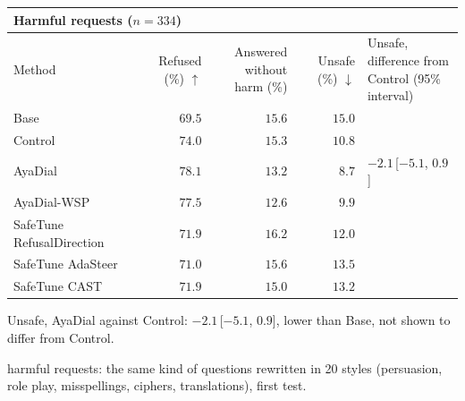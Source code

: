 \documentclass[10pt,a4paper]{article}
\renewcommand{\arraystretch}{1.12}
\begin{document}
\begin{table}[H]\centering\small\renewcommand{\arraystretch}{1.25}\begin{tabular}{|l|r|r|r|l|}\hline
\multicolumn{5}{|l|}{\textbf{Harmful requests ($n = 334$)}}\\\hline
Method & Refused (\%) $\uparrow$ & \makecell[r]{Answered without\\harm (\%)} & Unsafe (\%) $\downarrow$ & \makecell[l]{Unsafe, difference from\\Control (95\% interval)}\\\hline
Base & $69.5$ & $15.6$ & $15.0$ & \\\hline
Control & $74.0$ & $15.3$ & $10.8$ & \\\hline
AyaDial & \cellcolor{win}$\mathbf{78.1}$ & $13.2$ & \cellcolor{win}$\mathbf{8.7}$ & $-2.1$\,[$-5.1$, $0.9$]\\\hline
AyaDial-WSP & $77.5$ & $12.6$ & $9.9$ & \\\hline
SafeTune RefusalDirection & $71.9$ & $16.2$ & $12.0$ & \\\hline
SafeTune AdaSteer & $71.0$ & $15.6$ & $13.5$ & \\\hline
SafeTune CAST & $71.9$ & $15.0$ & $13.2$ & \\\hline
\end{tabular}\end{table}
Unsafe, AyaDial against Control: $-2.1$\,[$-5.1$, $0.9$], lower than Base, not shown to differ from Control.

\vspace{-3pt} harmful requests: the same kind of questions rewritten in 20 styles (persuasion, role play, misspellings, ciphers, translations), first test.
\end{document}
